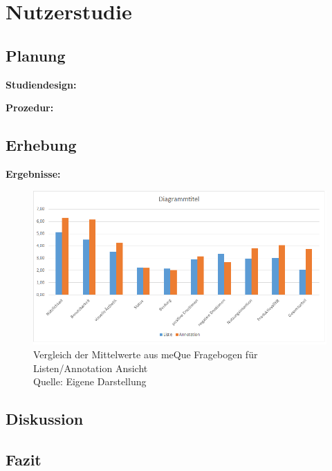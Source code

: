 \chapter{Nutzerstudie}

\section{Planung}

\textbf{Studiendesign:}

\textbf{Prozedur:}

\section{Erhebung}

\textbf{Ergebnisse:}

\begin{figure}[H]
	\centering
	\includegraphics[width=1.0\textwidth]{resources/evaluation/diagrammittel_vergleich_liste_annotation.png}
	\caption{Vergleich der Mittelwerte aus meQue Fragebogen für Listen/Annotation Ansicht \\Quelle: Eigene Darstellung}
	\label{img:avg_meQue_listAnnotation}
\end{figure}

\section{Diskussion}

\section{Fazit}